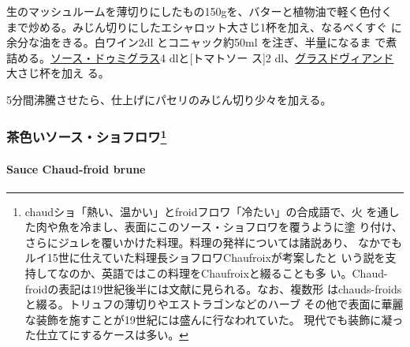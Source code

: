 \begin{recette}

生のマッシュルームを薄切りにしたもの150gを、バターと植物油で軽く色付く
まで炒める。みじん切りにしたエシャロット大さじ1杯を加え、なるべくすぐ
に余分な油をきる。白ワイン2dl とコニャック約50ml を注ぎ、半量になるま
で煮詰める。\protect\hyperlink{sauce-demi-glace}{ソース・ドゥミグラス}4
dlと{[}トマトソー ス{]}2
dl、\protect\hyperlink{glace-de-viande}{グラスドヴィアンド}大さじ\undemi{}杯を加え
る。

5分間沸騰させたら、仕上げにパセリのみじん切り少々を加える。

\maeaki

\hypertarget{ux8336ux8272ux3044ux30bdux30fcux30b9ux30b7ux30e7ux30d5ux30edux30ef15}{%
\subsubsection[茶色いソース・ショフロワ]{\texorpdfstring{茶色いソース・ショフロワ\footnote{chaudショ「熱い、温かい」とfroidフロワ「冷たい」の合成語で、火
  を通した肉や魚を冷まし、表面にこのソース・ショフロワを覆うように塗
  り付け、さらにジュレを覆いかけた料理。料理の発祥については諸説あり、
  なかでもルイ15世に仕えていた料理長ショフロワChaufroixが考案したと
  いう説を支持してなのか、英語ではこの料理をChaufroixと綴ることも多
  い。Chaud-froidの表記は19世紀後半には文献に見られる。なお、複数形
  はchauds-froidsと綴る。トリュフの薄切りやエストラゴンなどのハーブ
  その他で表面に華麗な装飾を施すことが19世紀には盛んに行なわれていた。
  現代でも装飾に凝った仕立てにするケースは多い。}}{茶色いソース・ショフロワ}}\label{ux8336ux8272ux3044ux30bdux30fcux30b9ux30b7ux30e7ux30d5ux30edux30ef15}}

\hypertarget{sauce-chaud-froid-brune}{%
\paragraph{Sauce Chaud-froid brune}\label{sauce-chaud-froid-brune}}


\end{recette}
